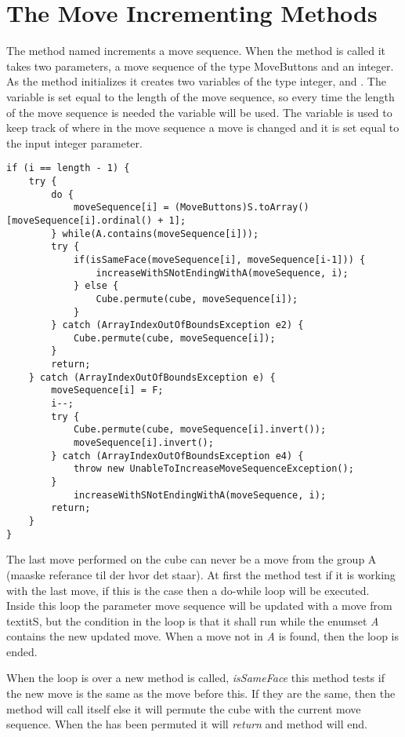 \section{The Move Incrementing Methods}
\label{sec:increaseWithSNotEndingWithA}
The method named  increments a move sequence.
When the method is called it takes two parameters, a move sequence of the type MoveButtons and an integer.
As the method initializes it creates two variables of the type integer,  and .
The variable  is set equal to the length of the move sequence, so every time the length of the move sequence is needed the variable  will be used.
The variable  is used to keep track of where in the move sequence a move is changed and it is set equal to the input integer parameter. 

\begin{lstlisting}[style=sourceCode, caption=\myCaption{Key point in the solve method of kociemba's optimal solver}, label=<some label>]
if (i == length - 1) {
	try {
		do {
			moveSequence[i] = (MoveButtons)S.toArray()[moveSequence[i].ordinal() + 1];
		} while(A.contains(moveSequence[i]));
		try {
			if(isSameFace(moveSequence[i], moveSequence[i-1])) {
				increaseWithSNotEndingWithA(moveSequence, i);
			} else {
				Cube.permute(cube, moveSequence[i]);
			}
		} catch (ArrayIndexOutOfBoundsException e2) {
			Cube.permute(cube, moveSequence[i]);
		}
		return;
	} catch (ArrayIndexOutOfBoundsException e) {
		moveSequence[i] = F;
		i--;
		try {
			Cube.permute(cube, moveSequence[i].invert());
			moveSequence[i].invert();
		} catch (ArrayIndexOutOfBoundsException e4) {
			throw new UnableToIncreaseMoveSequenceException();
		}
			increaseWithSNotEndingWithA(moveSequence, i);
		return;
	}
}
\end{lstlisting}

The last move performed on the cube can never be a move from the group A (maaske referance til der hvor det staar).
At first the method test if it is working with the last move, if this is the case then a do-while loop will be executed.
Inside this loop the parameter move sequence will be updated with a move from textit{S}, but the condition in the loop is that it shall run while the enumset \textit{A} contains the new updated move.
When a move not in \textit{A} is found, then the loop is ended.

When the loop is over a new method is called, \textit{isSameFace} this method tests if the new move is the same as the move before this.
If they are the same, then the method will call itself else it will permute the cube with the current move sequence.
When the \rubik{} has been permuted it will \textit{return} and method will end.

